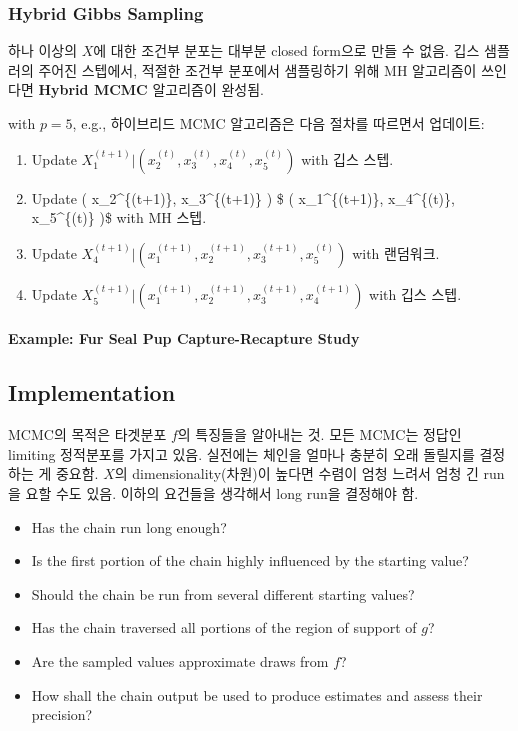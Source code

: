 \documentclass[
]{book}
\providecommand{\tightlist}{%
  \setlength{\itemsep}{0pt}\setlength{\parskip}{0pt}}
\begin{document}
\hypertarget{hybrid-gibbs-sampling}{%
\subsubsection{Hybrid Gibbs Sampling}\label{hybrid-gibbs-sampling}}

하나 이상의 \(X\)에 대한 조건부 분포는 대부분 closed form으로 만들 수 없음. 깁스 샘플러의 주어진 스텝에서, 적절한 조건부 분포에서 샘플링하기 위해 MH 알고리즘이 쓰인다면 \textbf{Hybrid MCMC} 알고리즘이 완성됨.

with \(p=5\), e.g., 하이브리드 MCMC 알고리즘은 다음 절차를 따르면서 업데이트:

\begin{enumerate}
\def\labelenumi{\arabic{enumi}.}
\tightlist
\item
  Update \(X_1^{(t+1)} \rvert \left( x_2^{(t)}, x_3^{(t)}, x_4^{(t)}, x_5^{(t)} \right)\) with 깁스 스텝.
\item
  Update \left( x\_2\^{}\{(t+1)\}, x\_3\^{}\{(t+1)\} \right) \$ \rvert \left( x\_1\^{}\{(t+1)\}, x\_4\^{}\{(t)\}, x\_5\^{}\{(t)\} \right)\$ with MH 스텝.
\item
  Update \(X_4^{(t+1)} \rvert \left( x_1^{(t+1)}, x_2^{(t+1)}, x_3^{(t+1)}, x_5^{(t)} \right)\) with 랜덤워크.
\item
  Update \(X_5^{(t+1)} \rvert \left( x_1^{(t+1)}, x_2^{(t+1)}, x_3^{(t+1)}, x_4^{(t+1)} \right)\) with 깁스 스텝.
\end{enumerate}

\hypertarget{example-fur-seal-pup-capture-recapture-study}{%
\paragraph{Example: Fur Seal Pup Capture-Recapture Study}\label{example-fur-seal-pup-capture-recapture-study}}

\hypertarget{implementation}{%
\subsection{Implementation}\label{implementation}}

MCMC의 목적은 타겟분포 \(f\)의 특징들을 알아내는 것. 모든 MCMC는 정답인 limiting 정적분포를 가지고 있음. 실전에는 체인을 얼마나 충분히 오래 돌릴지를 결정하는 게 중요함. \(X\)의 dimensionality(차원)이 높다면 수렴이 엄청 느려서 엄청 긴 run을 요할 수도 있음. 이하의 요건들을 생각해서 long run을 결정해야 함.

\begin{itemize}
\tightlist
\item
  Has the chain run long enough?
\item
  Is the first portion of the chain highly influenced by the starting value?
\item
  Should the chain be run from several different starting values?
\item
  Has the chain traversed all portions of the region of support of \(g\)?
\item
  Are the sampled values approximate draws from \(f\)?
\item
  How shall the chain output be used to produce estimates and assess their precision?
\end{itemize}
\end{document}
